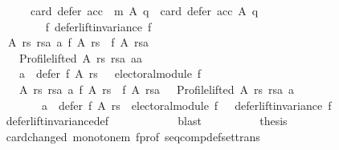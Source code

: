 \begin{isabellebody}
\ \ \ \ \ \ \ \ \ \ \ \ \ \ \ \ card\ {\isacharparenleft}{\kern0pt}defer\ {\isacharparenleft}{\kern0pt}acc\ {\isasymtriangleright}\ m{\isacharparenright}{\kern0pt}\ A\ q{\isacharparenright}{\kern0pt}\ {\isasymnoteq}\ {\isacharparenleft}{\kern0pt}card\ {\isacharparenleft}{\kern0pt}defer\ acc\ A\ q{\isacharparenright}{\kern0pt}{\isacharparenright}{\kern0pt}{\isacharparenright}{\kern0pt}{\isachardoublequoteclose}\isanewline
\ \ \ \ \ \ \isamarkupfalse%
\ {\isacharminus}{\kern0pt}\isanewline
\ \ \ \ \ \ \ \ \isamarkupfalse%
\isanewline
\ \ \ \ \ \ \ \ \ \ {\isachardoublequoteopen}{\isasymforall}f{\isachardot}{\kern0pt}\ {\isacharparenleft}{\kern0pt}defer{\isacharunderscore}{\kern0pt}lift{\isacharunderscore}{\kern0pt}invariance\ f\ {\isasymor}\isanewline
\ \ \ \ \ \ \ \ \ \ \ \ {\isacharparenleft}{\kern0pt}{\isasymexists}A\ rs\ rsa\ a{\isachardot}{\kern0pt}\ f\ A\ rs\ {\isasymnoteq}\ f\ A\ rsa\ {\isasymand}\isanewline
\ \ \ \ \ \ \ \ \ \ \ \ \ \ Profile{\isachardot}{\kern0pt}lifted\ A\ rs\ rsa\ {\isacharparenleft}{\kern0pt}a{\isacharcolon}{\kern0pt}{\isacharcolon}{\kern0pt}{\isacharprime}{\kern0pt}a{\isacharparenright}{\kern0pt}\ {\isasymand}\isanewline
\ \ \ \ \ \ \ \ \ \ \ \ \ \ a\ {\isasymin}\ defer\ f\ A\ rs{\isacharparenright}{\kern0pt}\ {\isasymor}\ {\isasymnot}\ electoral{\isacharunderscore}{\kern0pt}module\ f{\isacharparenright}{\kern0pt}\ {\isasymand}\isanewline
\ \ \ \ \ \ \ \ \ \ \ \ \ \ {\isacharparenleft}{\kern0pt}{\isacharparenleft}{\kern0pt}{\isasymforall}A\ rs\ rsa\ a{\isachardot}{\kern0pt}\ f\ A\ rs\ {\isacharequal}{\kern0pt}\ f\ A\ rsa\ {\isasymor}\ {\isasymnot}\ Profile{\isachardot}{\kern0pt}lifted\ A\ rs\ rsa\ a\ {\isasymor}\isanewline
\ \ \ \ \ \ \ \ \ \ \ \ \ \ \ \ \ \ a\ {\isasymnotin}\ defer\ f\ A\ rs{\isacharparenright}{\kern0pt}\ {\isasymand}\ electoral{\isacharunderscore}{\kern0pt}module\ f\ {\isasymor}\ {\isasymnot}\ defer{\isacharunderscore}{\kern0pt}lift{\isacharunderscore}{\kern0pt}invariance\ f{\isacharparenright}{\kern0pt}{\isachardoublequoteclose}\isanewline
\ \ \ \ \ \ \ \ \ \ \isamarkupfalse%
\ defer{\isacharunderscore}{\kern0pt}lift{\isacharunderscore}{\kern0pt}invariance{\isacharunderscore}{\kern0pt}def\isanewline
\ \ \ \ \ \ \ \ \ \ \isamarkupfalse%
\ blast\isanewline
\ \ \ \ \ \ \ \ \isamarkupfalse%
\ {\isacharquery}{\kern0pt}thesis\isanewline
\ \ \ \ \ \ \ \ \ \ \isamarkupfalse%
\ card{\isacharunderscore}{\kern0pt}changed\ monotone{\isacharunderscore}{\kern0pt}m\ f{\isacharunderscore}{\kern0pt}prof\ seq{\isacharunderscore}{\kern0pt}comp{\isacharunderscore}{\kern0pt}def{\isacharunderscore}{\kern0pt}set{\isacharunderscore}{\kern0pt}trans\isanewline

\end{isabellebody}
